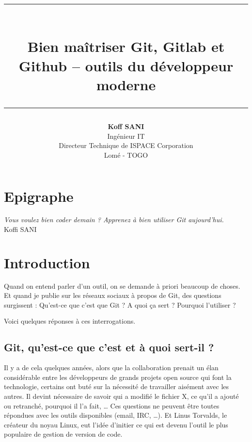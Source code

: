 \documentclass[11pt, a4paper]{book}
\author{\textbf{Koff SANI} \\ Ing\'enieur IT \\ Directeur Technique de ISPACE Corporation \\ Lomé - TOGO}
\begin{document}
\title{ \begin{figure} \begin{center}
 \end{center} \end{figure}
 \rule{13cm}{0.15cm}\\
  \textbf{\textbf{ Bien ma\^itriser Git, Gitlab et Github -- outils du développeur moderne }}\\ 
 \rule{13cm
}{0.15cm}
}
 
\date{}

\maketitle
\chapter*{Epigraphe}
\begin{flushright}
\emph{ Vous voulez bien coder demain ? Apprenez à bien utiliser Git aujourd'hui.}\\ Koffi SANI
\end{flushright}

\tableofcontents
\setcounter{tocdepth}{3}
\newcommand{\ud}{\mathrm{d}}
\newcommand{\lo}{\mathrm{Log}}
\newcommand{\arct}{\mathrm{Arctan}}

\chapter{Introduction}

Quand on entend parler d’un outil, on se demande à priori beaucoup de choses. Et quand je publie sur les réseaux sociaux à propos de Git, des questions surgissent : Qu’est-ce que c’est que Git ? A quoi ça sert ? Pourquoi l’utiliser ?

Voici quelques réponses à ces interrogations.
\section{Git, qu'est-ce que c'est et à quoi sert-il ? }

Il y a de cela quelques années, alors que la collaboration prenait un élan considérable entre les développeurs de grands projets open source qui font la technologie, certains ont buté sur la nécessité de travailler aisément avec les autres. Il devint nécessaire de savoir qui a modifié le fichier X, ce qu’il a ajouté ou retranché, pourquoi il l’a fait, … Ces questions ne peuvent être toutes répondues avec les outils disponibles (email, IRC, …). Et Linus Torvalds, le créateur du noyau Linux, eut l’idée d’initier ce qui est devenu l’outil le plus populaire de gestion de version de code.
\end{document}
